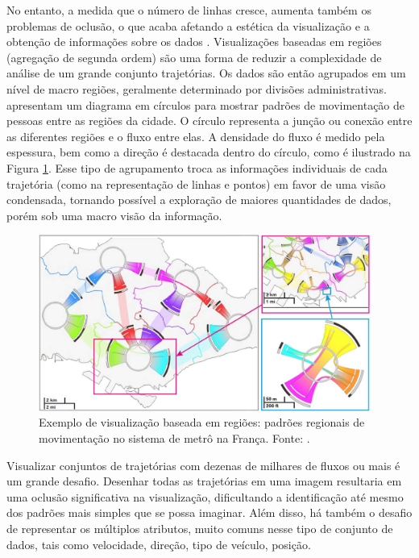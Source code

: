 No entanto, a medida que o número de linhas cresce, aumenta também os
problemas de oclusão, o que acaba afetando a estética da visualização e a
obtenção de informações sobre os dados \citep{Zhou2013}. Visualizações baseadas
em regiões (agregação de segunda ordem) são uma forma de reduzir
a complexidade de análise de um grande conjunto trajetórias. Os dados 
são então agrupados em um nível de macro regiões, geralmente determinado por divisões administrativas.
\citet{Zeng2013} apresentam um diagrama em círculos para mostrar padrões de movimentação de
pessoas entre as regiões da cidade. O círculo representa a junção ou conexão
entre as diferentes regiões e o fluxo entre elas. A densidade do fluxo é medido
pela espessura, bem como a direção é destacada dentro do círculo, como é
ilustrado na Figura \ref{fig:interchange-circo}. Esse tipo de agrupamento
troca as informações individuais de cada trajetória  (como na representação de linhas e pontos)
em favor de uma visão condensada, tornando possível a exploração de maiores quantidades de dados, porém
sob uma macro visão da informação.

\begin{figure}[!h]
  \centering
  \includegraphics[width=0.97\textwidth]{../figuras/region-based.png}
  \caption[Exemplo de visualização baseada em regiões do sistema de metrô na França]{Exemplo de visualização baseada em regiões: padrões regionais de movimentação no sistema de metrô na França. Fonte: \citet{Zeng2013}.}
  \label{fig:interchange-circo}
\end{figure}

Visualizar conjuntos de trajetórias com dezenas de milhares de fluxos ou mais é um grande desafio.
Desenhar todas as trajetórias em uma imagem resultaria em uma oclusão significativa na visualização,
dificultando a identificação até mesmo dos padrões mais simples que se possa imaginar. Além disso,
há também o desafio de representar os múltiplos atributos, muito comuns nesse tipo de conjunto de dados,
tais como velocidade, direção, tipo de veículo, posição. 

